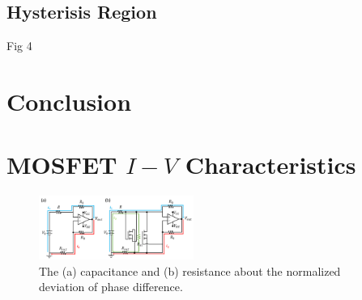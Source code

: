 \documentclass[%
 aip,
amsmath,amssymb,
reprint,
]{revtex4-1}
\begin{document}
\subsection{Hysterisis Region}
Fig 4

\section{\label{sec:Conclusion} Conclusion}

\appendix

\section{\label{mosfetiv}MOSFET $I-V$ Characteristics}
\begin{figure}[!h]
  \centering
  \includegraphics[width=0.45\textwidth]{./figures/TheoryCalc.png}
  \caption{The (a) capacitance and (b) resistance about the normalized deviation of phase difference. }
  \label{fig:stdphiandRC}
\end{figure}
\end{document}
